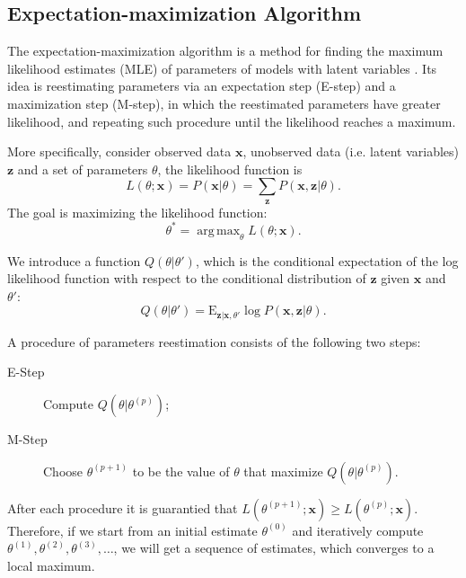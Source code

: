 \documentclass[12pt,final,twoside]{report}
\theoremstyle{plain}
\theoremstyle{definition}
\theoremstyle{remark}
\DeclareMathOperator*{\argmax}{arg\,max}
\begin{document}
\subsection{Expectation-maximization Algorithm}
The expectation-maximization algorithm is a method for finding the maximum likelihood estimates (MLE) of parameters of models with latent variables \cite{dempster_maximum_1977}. Its idea is reestimating parameters via an expectation step (E-step) and a maximization step (M-step), in which the reestimated parameters have greater likelihood, and repeating such procedure until the likelihood reaches a maximum.

More specifically, consider observed data $\mathbf{x}$, unobserved data (i.e. latent variables) $\mathbf{z}$ and a set of parameters $\theta$, the likelihood function is
\begin{equation}
  L(\theta;\mathbf{x}) = P(\mathbf{x}|\theta) = \sum_{\mathbf{z}} P(\mathbf{x},\mathbf{z}|\theta) .
\end{equation}
The goal is maximizing the likelihood function:
\begin{equation}
  \theta^* = \argmax_\theta L(\theta;\mathbf{x}).
\end{equation}

We introduce a function $Q(\theta|\theta')$, which is the conditional expectation of the log likelihood function with respect to the conditional distribution of $\mathbf{z}$ given $\mathbf{x}$ and $\theta'$:
\begin{equation}
  Q(\theta|\theta') = \text{E}_{\mathbf{z}|\mathbf{x},\theta'} \log P(\mathbf{x},\mathbf{z}|\theta) .
\end{equation}

A procedure of parameters reestimation consists of the following two steps:
\begin{description}
  \item[E-Step] Compute $Q(\theta|\theta^{(p)})$;
  \item[M-Step] Choose $\theta^{(p+1)}$ to be the value of $\theta$ that maximize $Q(\theta|\theta^{(p)})$.
\end{description}

After each procedure it is guarantied that $L(\theta^{(p+1)};\mathbf{x}) \geq L(\theta^{(p)};\mathbf{x})$. Therefore, if we start from an initial estimate $\theta^{(0)}$ and iteratively compute $\theta^{(1)},\theta^{(2)},\theta^{(3)},\dots$, we will get a sequence of estimates, which converges to a local maximum.
\end{document}
